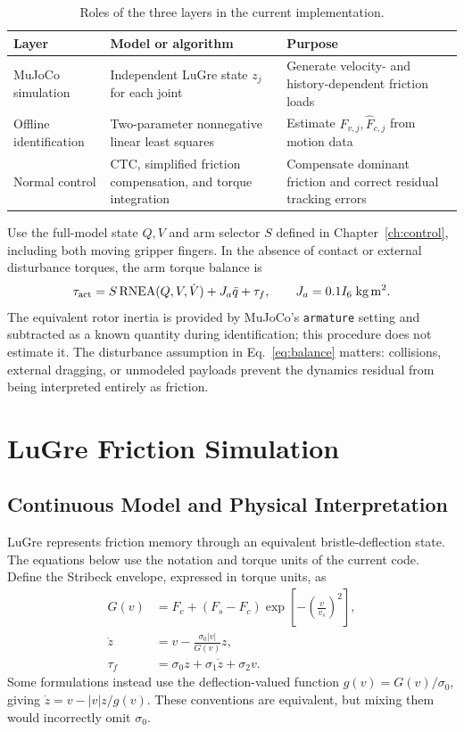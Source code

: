 \documentclass[11pt,a4paper]{report}
\newcommand{\RNEA}{\operatorname{RNEA}}
\begin{document}
\begin{table}[htbp]
\centering
\caption{Roles of the three layers in the current implementation.}
\begin{tabularx}{\linewidth}{lXX}
\toprule
Layer & Model or algorithm & Purpose\\
\midrule
MuJoCo simulation & Independent LuGre state $z_j$ for each joint & Generate velocity- and history-dependent friction loads\\
Offline identification & Two-parameter nonnegative linear least squares & Estimate $\widehat F_{v,j},\widehat F_{c,j}$ from motion data\\
Normal control & CTC, simplified friction compensation, and torque integration & Compensate dominant friction and correct residual tracking errors\\
\bottomrule
\end{tabularx}
\end{table}

Use the full-model state $Q,V$ and arm selector $S$ defined in
Chapter~\ref{ch:control}, including both moving gripper fingers.
In the absence of contact or external disturbance torques, the arm torque balance is
\begin{equation}
 \tau_{\rm act}=S\RNEA(Q,V,\dot V)+J_a\ddot q+\tau_f,
 \qquad J_a=0.1I_6\;\mathrm{kg\,m^2}.
 \label{eq:balance}
\end{equation}
The equivalent rotor inertia is provided by MuJoCo's \texttt{armature} setting and subtracted as a known quantity during identification; this procedure does not estimate it. The disturbance assumption in Eq.~\eqref{eq:balance} matters: collisions, external dragging, or unmodeled payloads prevent the dynamics residual from being interpreted entirely as friction.

\section{LuGre Friction Simulation}
\subsection{Continuous Model and Physical Interpretation}
LuGre represents friction memory through an equivalent bristle-deflection state. The equations below use the notation and torque units of the current code. Define the Stribeck envelope, expressed in torque units, as
\begin{align}
 G(v)&=F_c+(F_s-F_c)\exp\!\left[-\left(\frac{v}{v_s}\right)^2\right],\label{eq:G}\\
 \dot z&=v-\frac{\sigma_0|v|}{G(v)}z,\label{eq:z}\\
 \tau_f&=\sigma_0z+\sigma_1\dot z+\sigma_2v.\label{eq:lugre}
\end{align}
Some formulations instead use the deflection-valued function $g(v)=G(v)/\sigma_0$, giving $\dot z=v-|v|z/g(v)$. These conventions are equivalent, but mixing them would incorrectly omit $\sigma_0$.
\end{document}
